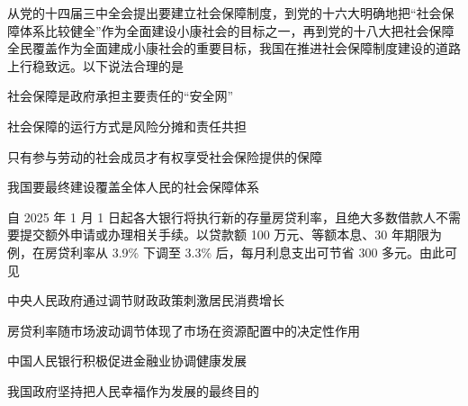 \documentclass{exam-zh}
\begin{document}
\begin{question}
从党的十四届三中全会提出要建立社会保障制度，到党的十六大明确地把“社会保障体系比较健全”作为全面建设小康社会的目标之一，再到党的十八大把社会保障全民覆盖作为全面建成小康社会的重要目标，我国在推进社会保障制度建设的道路上行稳致远。以下说法合理的是

 社会保障是政府承担主要责任的“安全网”

 社会保障的运行方式是风险分摊和责任共担

 只有参与劳动的社会成员才有权享受社会保险提供的保障

 我国要最终建设覆盖全体人民的社会保障体系

\begin{choices}
\item {}
\item {}
\item {}
\item {}
\end{choices}
\end{question}

\begin{question}
自 2025 年 1 月 1 日起各大银行将执行新的存量房贷利率，且绝大多数借款人不需要提交额外申请或办理相关手续。以贷款额 100 万元、等额本息、30 年期限为例，在房贷利率从 3.9\% 下调至 3.3\% 后，每月利息支出可节省 300 多元。由此可见

 中央人民政府通过调节财政政策刺激居民消费增长

 房贷利率随市场波动调节体现了市场在资源配置中的决定性作用

 中国人民银行积极促进金融业协调健康发展

 我国政府坚持把人民幸福作为发展的最终目的

\begin{choices}
\item {}
\item {}
\item {}
\item {}
\end{choices}
\end{question}
\end{document}
